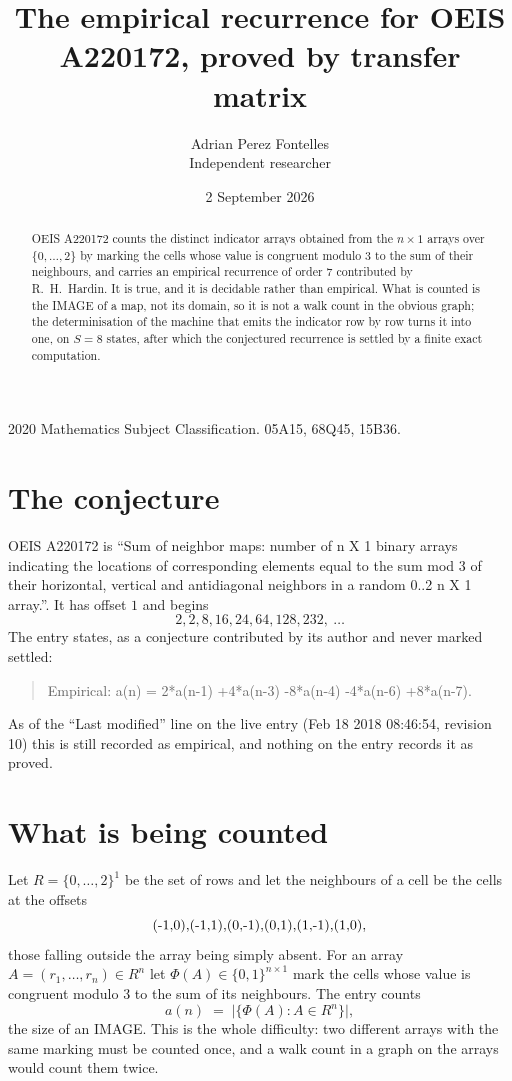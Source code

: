 \documentclass[11pt,a4paper]{article}
\title{The empirical recurrence for OEIS A220172, proved by transfer matrix}
\author{Adrian Perez Fontelles\\ \small Independent researcher}
\date{2 September 2026}
\theoremstyle{plain}
\theoremstyle{definition}
\begin{document}
\maketitle

\begin{abstract}
OEIS A220172 counts the distinct indicator arrays obtained from the $n\times1$ arrays over
$\{0,\dots,2\}$ by marking the cells whose value is congruent modulo 3 to the sum of their neighbours, and carries an
empirical recurrence of order $7$ contributed by R.~H.~Hardin. It is true, and it is
decidable rather than empirical. What is counted is the IMAGE of a map, not its domain, so it
is not a walk count in the obvious graph; the determinisation of the machine that emits the
indicator row by row turns it into one, on $S=8$ states, after which the conjectured
recurrence is settled by a finite exact computation.
\end{abstract}

\noindent\small 2020 Mathematics Subject Classification. 05A15, 68Q45, 15B36.\normalsize

\section{The conjecture}

OEIS A220172 is ``Sum of neighbor maps: number of n X 1 binary arrays indicating the locations of corresponding elements equal to the sum mod 3 of their horizontal, vertical and antidiagonal neighbors in a random 0..2 n X 1 array.''. It has offset $1$ and begins
\[
2, 2, 8, 16, 24, 64, 128, 232,\ \dots
\]
The entry states, as a conjecture contributed by its author and never marked settled:
\begin{quote}
Empirical: a(n) = 2*a(n-1) +4*a(n-3) -8*a(n-4) -4*a(n-6) +8*a(n-7).
\end{quote}
As of the ``Last modified'' line on the live entry (Feb 18 2018 08:46:54, revision 10) this is still
recorded as empirical, and nothing on the entry records it as proved.

\section{What is being counted}

Let $R=\{0,\dots,2\}^{1}$ be the set of rows and let the neighbours of a cell be the
cells at the offsets
\[
$(-1,0)$, $(-1,1)$, $(0,-1)$, $(0,1)$, $(1,-1)$, $(1,0)$,
\]
those falling outside the array being simply absent. For an array
$A=(r_1,\dots,r_n)\in R^n$ let $\Phi(A)\in\{0,1\}^{n\times1}$ mark the cells whose value
is congruent modulo 3 to the sum of its neighbours. The entry counts
\[
a(n)\;=\;\bigl|\{\Phi(A):A\in R^n\}\bigr| ,
\]
the size of an IMAGE. This is the whole difficulty: two different arrays with the same marking
must be counted once, and a walk count in a graph on the arrays would count them twice.
\end{document}
